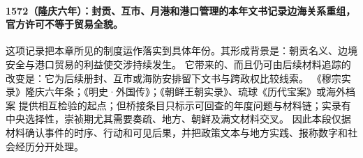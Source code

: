 \paragraph{1572（隆庆六年）：封贡、互市、月港和港口管理的本年文书记录边海关系重组，官方许可不等于贸易全貌。} 这项记录把本章所见的制度运作落实到具体年份。其形成背景是：朝贡名义、边境安全与港口贸易的利益使交涉持续发生。 它带来的、而且仍可由后续材料追踪的改变是：它为后续册封、互市或海防安排留下文书与跨政权比较线索。 《穆宗实录》隆庆六年条；《明史·外国传》；《朝鲜王朝实录》、琉球《历代宝案》或海外档案 提供相互检验的起点；但桥接条目只标示可回查的年度问题与材料链；实录有中央选择性，崇祯期尤其需要奏疏、地方、朝鲜及满文材料交叉。 因此本段仅据材料确认事件的时序、行动和可见后果，并把政策文本与地方实践、报称数字和社会经历分开处理。
